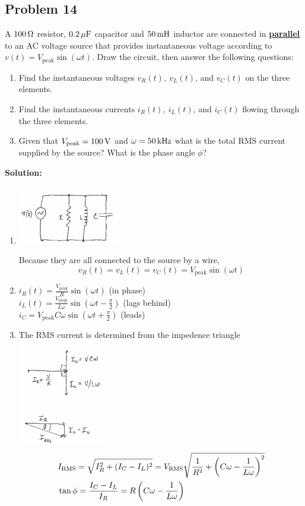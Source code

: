 \subsection*{Problem 14}
A $100\,\mathrm{\Omega}$ resistor, $0.2\,\mathrm{\mu F}$ capacitor and $50\,\mathrm{mH}$ inductor are connected in \textbf{\underline{parallel}} to an AC voltage source that provides instantaneous voltage according to $v(t)=V_\text{peak}\sin(\omega t)$. Draw the circuit, then answer the following questions:
\begin{enumerate}
    \item Find the instantaneous voltages $v_R(t),\ v_L(t)$, and $v_C(t)$ on the three elements.
    \item Find the instantaneous currents $i_R(t),\ i_L(t)$, and $i_C(t)$ flowing through the three elements.
    \item Given that $V_\text{peak}=100\,\mathrm{V}$ and $\omega=50\,\mathrm{kHz}$ what is the total RMS current supplied by the source? What is the phase angle $\phi$?
\end{enumerate}

\textbf{Solution:}
\begin{enumerate}
    \item \centerline{\includegraphics[width=0.35\textwidth]{Images/P14img1.png}}
    Because they are all connected to the source by a wire,
    \[v_R(t)=v_L(t)=v_C(t)=V_\text{peak}\sin(\omega t)\]
    \item $i_R(t)=\frac{V_\text{peak}}{R}\sin(\omega t)$ (in phase)\\
    $i_L(t)=\frac{V_\text{peak}}{L\omega}\sin(\omega t-\frac{\pi}{2})$ (lags behind)\\
    $i_C=V_\text{peak}C\omega\sin(\omega t+\frac{\pi}{2})$ (leads)
    \item The RMS current is determined from the impedence triangle\\
    \includegraphics[width=0.3\textwidth]{Images/P14img2.png}
    \begin{align*}
        &I_\text{RMS}=\sqrt{I_R^2+(I_C-I_L)^2}=V_\text{RMS}\sqrt{\frac{1}{R^2}+\left( C\omega-\frac{1}{L\omega} \right)^2}\\
        &\tan\phi=\frac{I_C-I_L}{I_R}=R\left( C\omega-\frac{1}{L\omega} \right)
    \end{align*}
\end{enumerate}